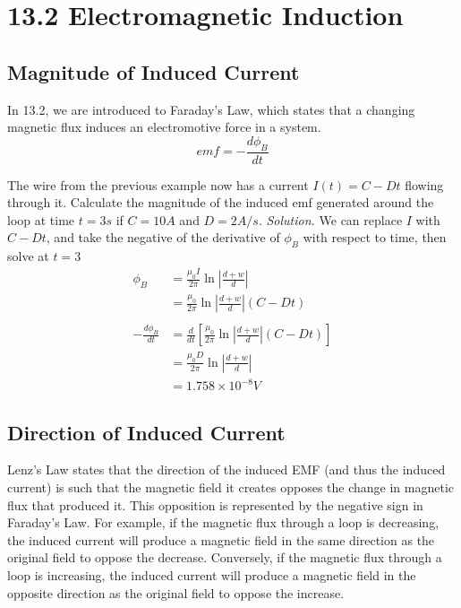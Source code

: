 \documentclass[12pt, titlepage]{article}
\begin{document}
\section*{13.2 Electromagnetic Induction}
\subsection*{Magnitude of Induced Current}
In 13.2, we are introduced to Faraday's Law, which states that a changing magnetic flux induces an electromotive force in a system.
\begin{equation*}
    emf = -\frac{d\phi_B}{dt}
\end{equation*}
\begin{Problem}
    The wire from the previous example now has a current $I(t) = C-Dt$ flowing through it. Calculate the magnitude of the induced emf generated around the loop at time $t=3s$ if $C=10A$ and $D=2A/s$.
    \tcblower
    \textit{Solution. }We can replace $I$ with $C-Dt$, and take the negative of the derivative of $\phi_B$ with respect to time, then solve at $t=3$
    \begin{align*}
        \phi_B &= \frac{\mu_0 I}{2\pi} \ln |\frac{d+w}{d}| \\
        & = \frac{\mu_0 }{2\pi} \ln |\frac{d+w}{d}| (C-Dt) \\ \\
        -\frac{d\phi_B}{dt} &= \frac{d}{dt} \left[\frac{\mu_0 }{2\pi} \ln |\frac{d+w}{d}| (C-Dt)\right] \\
        & = \frac{\mu_0 D}{2\pi} \ln |\frac{d+w}{d}| \\
        & = \boxed{1.758 \times 10^{-8} V}
    \end{align*}
\end{Problem}

\subsection*{Direction of Induced Current}
Lenz’s Law states that the direction of the induced EMF (and thus the induced current) is such that the magnetic field it creates opposes the change in magnetic flux that produced it. This opposition is represented by the negative sign in Faraday’s Law. For example, if the magnetic flux through a loop is decreasing, the induced current will produce a magnetic field in the same direction as the original field to oppose the decrease. Conversely, if the magnetic flux through a loop is increasing, the induced current will produce a magnetic field in the opposite direction as the original field to oppose the increase.
\end{document}
